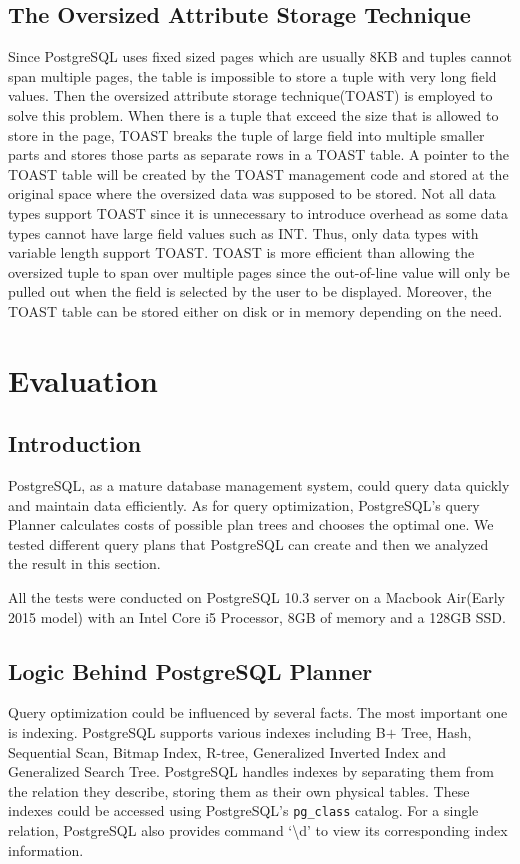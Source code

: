 \documentclass[a4paper]{article}
\begin{document}
\subsection{The Oversized Attribute Storage Technique}
Since PostgreSQL uses fixed sized pages which are usually 8KB and tuples cannot span multiple pages, the table is impossible to store a tuple with very long field values. Then the oversized attribute storage technique(TOAST) is employed to solve this problem. When there is a tuple that exceed the size that is allowed to store in the page, TOAST breaks the tuple of large field into multiple smaller parts and stores those parts as separate rows in a TOAST table. A pointer to the TOAST table will be created by the TOAST management code and stored at the original space where the oversized data was supposed to be stored. Not all data types support TOAST since it is unnecessary to introduce overhead as some data types cannot have large field values such as INT. Thus, only data types with variable length support TOAST. TOAST is more efficient than allowing the oversized tuple to span over multiple pages since the out-of-line value will only be pulled out when the field is selected by the user to be displayed. Moreover, the TOAST table can be stored either on disk or in memory depending on the need\cite{1}.


\section{Evaluation}
\subsection{Introduction}
PostgreSQL, as a mature database management system, could query data quickly and maintain data efficiently. As for query optimization, PostgreSQL's query Planner calculates costs of possible plan trees and chooses the optimal one\cite{1}. We tested different query plans that PostgreSQL can create and then we analyzed the result in this section.  

All the tests were conducted on PostgreSQL 10.3 server on a Macbook Air(Early 2015 model) with an Intel Core i5 Processor, 8GB of memory and a 128GB SSD. 

\subsection{Logic Behind PostgreSQL Planner}
Query optimization could be influenced by several facts. The most important one is indexing. PostgreSQL supports various indexes including B$+$ Tree, Hash, Sequential Scan, Bitmap Index, R-tree, Generalized Inverted Index and Generalized Search Tree. PostgreSQL handles indexes by separating them from the relation they describe, storing them as their own physical tables. These indexes could be accessed using PostgreSQL's \texttt{pg\_class} catalog\cite{1}. For a single relation, PostgreSQL also provides command `\textbackslash d' to view its corresponding index information.
\end{document}
